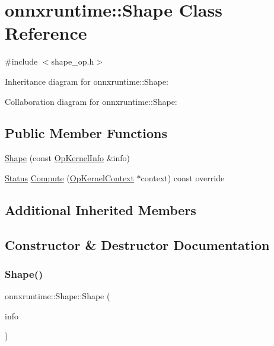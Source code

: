 \hypertarget{classonnxruntime_1_1Shape}{}\section{onnxruntime\+:\+:Shape Class Reference}
\label{classonnxruntime_1_1Shape}


{\ttfamily \#include $<$shape\+\_\+op.\+h$>$}



Inheritance diagram for onnxruntime\+:\+:Shape\+:


Collaboration diagram for onnxruntime\+:\+:Shape\+:
\subsection*{Public Member Functions}
\begin{DoxyCompactItemize}
\item 
\mbox{\hyperlink{classonnxruntime_1_1Shape_ab106d81b54177d6572b60ffa7ad6e7cc}{Shape}} (const \mbox{\hyperlink{classonnxruntime_1_1OpKernelInfo}{Op\+Kernel\+Info}} \&info)
\item 
\mbox{\hyperlink{classonnxruntime_1_1common_1_1Status}{Status}} \mbox{\hyperlink{classonnxruntime_1_1Shape_a95830d9c4577aba0591a74dbfe538498}{Compute}} (\mbox{\hyperlink{classonnxruntime_1_1OpKernelContext}{Op\+Kernel\+Context}} $\ast$context) const override
\end{DoxyCompactItemize}
\subsection*{Additional Inherited Members}


\subsection{Constructor \& Destructor Documentation}
\mbox{\label{classonnxruntime_1_1Shape_ab106d81b54177d6572b60ffa7ad6e7cc}} 
\subsubsection{\texorpdfstring{Shape()}{Shape()}}
{\footnotesize\ttfamily onnxruntime\+::\+Shape\+::\+Shape (\begin{DoxyParamCaption}\item[{const \mbox{\hyperlink{classonnxruntime_1_1OpKernelInfo}{Op\+Kernel\+Info}} \&}]{info }\end{DoxyParamCaption})\hspace{0.3cm}{\ttfamily [inline]}}



